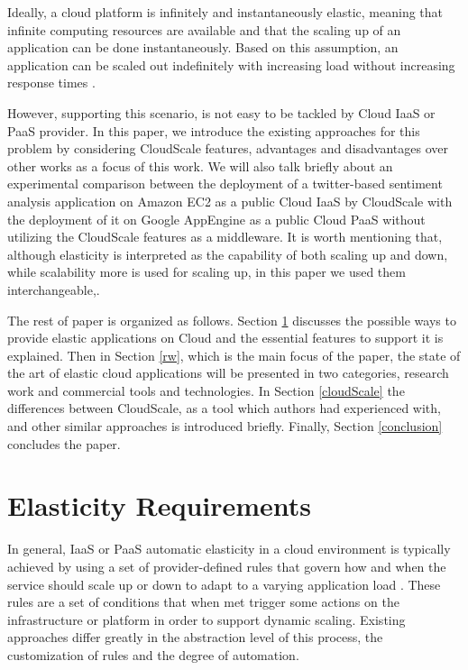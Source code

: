 \documentclass{sig-alternate}
\begin{document}
Ideally, a cloud platform is infinitely and instantaneously elastic, meaning that infinite computing resources are available and that the scaling up of an application can be done instantaneously. Based on this assumption, an application can be scaled out indefinitely with increasing load without increasing response times \cite{brebner2012your}. 

However, supporting this scenario, is not easy to be tackled by Cloud IaaS or PaaS provider. In this paper, we introduce the existing approaches for this problem by considering CloudScale \cite{leitner2012cloudscale} features, advantages and disadvantages over other works as a focus of this work. We will also talk briefly about an experimental comparison between the deployment of a twitter-based sentiment analysis application on Amazon EC2 as a public Cloud IaaS by CloudScale with the deployment of it on Google AppEngine as a public Cloud PaaS without utilizing the CloudScale features as a middleware. It is worth mentioning that, although elasticity is interpreted as the capability of both scaling up and down, while scalability more is used for scaling up, in this paper we used them interchangeable,.

The rest of paper is organized as follows. Section \ref{elasticity-req} discusses the possible ways to provide elastic applications on Cloud and the essential features to support it is explained. Then in Section \ref{rw}, which is the main focus of the paper, the state of the art of elastic cloud applications will be presented in two categories, research work and commercial tools and technologies. In Section \ref{cloudScale} the differences between CloudScale, as a tool which authors had experienced with, and other similar approaches is introduced briefly. Finally, Section \ref{conclusion} concludes the paper.

\section{Elasticity Requirements} \label{elasticity-req}
In general, IaaS or PaaS automatic elasticity in a cloud environment is typically achieved by using a set of provider-defined rules that govern how and when the service should scale up or down to adapt to a varying application load \cite{vaquero2011dynamically}. These rules are a set of conditions that when met trigger some actions on the infrastructure or platform in order to support dynamic scaling. Existing approaches differ greatly in the abstraction level of this process, the customization of rules and the degree of automation.
\end{document}

